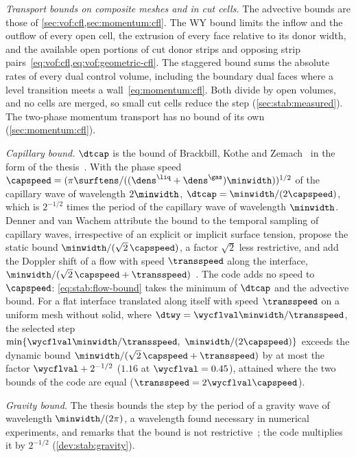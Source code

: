 \emph{Transport bounds on composite meshes and in cut cells.} The advective
bounds are those of \cref{sec:vof:cfl,sec:momentum:cfl}. The WY bound limits
the inflow and the outflow of every open cell, the extrusion of every
face relative to its donor width, and the available open portions of cut
donor strips and opposing strip pairs~\cref{eq:vof:cfl,eq:vof:geometric-cfl}.
The staggered bound sums the absolute rates of every dual
control volume, including the boundary dual faces where a level transition
meets a wall~\cref{eq:momentum:cfl}. Both divide by open volumes, and no
cells are merged, so small cut cells reduce the step
(\cref{sec:stab:measured}). The two-phase momentum transport has no bound of
its own (\cref{sec:momentum:cfl}).

\emph{Capillary bound.} $\dtcap$ is the bound of Brackbill, Kothe and
Zemach~\cite{brackbill1992} in the form of the thesis~.
With the phase speed $\capspeed=(\pi\surftens/((\dens^{\liq}+\dens^{\gas})\minwidth))^{1/2}$
of the capillary wave of wavelength $2\minwidth$, $\dtcap=\minwidth/(2\capspeed)$,
which is $2^{-1/2}$ times the period of the capillary wave of wavelength
$\minwidth$. Denner and van Wachem attribute the bound to the temporal
sampling of capillary waves, irrespective of an explicit or implicit surface
tension, propose the static bound $\minwidth/(\sqrt2\,\capspeed)$, a factor
$\sqrt2$ less restrictive, and add the Doppler shift of a flow with speed
$\transspeed$ along the interface,
$\minwidth/(\sqrt2\,\capspeed+\transspeed)$~\cite[eqs.~(43)--(44)]{denner2015}.
The code adds no speed to $\capspeed$: \cref{eq:stab:flow-bound} takes the
minimum of $\dtcap$ and the advective bound. For a flat interface translated
along itself with speed $\transspeed$ on a uniform mesh without solid, where
$\dtwy=\wycflval\minwidth/\transspeed$, the selected step
$\min\{\wycflval\minwidth/\transspeed,\ \minwidth/(2\capspeed)\}$ exceeds
the dynamic bound $\minwidth/(\sqrt2\,\capspeed+\transspeed)$ by at most the
factor $\wycflval+2^{-1/2}$ ($1.16$ at $\wycflval=0.45$), attained where the
two bounds of the code are equal ($\transspeed=2\wycflval\capspeed$).

\emph{Gravity bound.} The thesis bounds the step by the period of a gravity
wave of wavelength $\minwidth/(2\pi)$, a wavelength found necessary in
numerical experiments, and remarks that the bound is not
restrictive~; the code multiplies it by $2^{-1/2}$
(\cref{dev:stab:gravity}).

